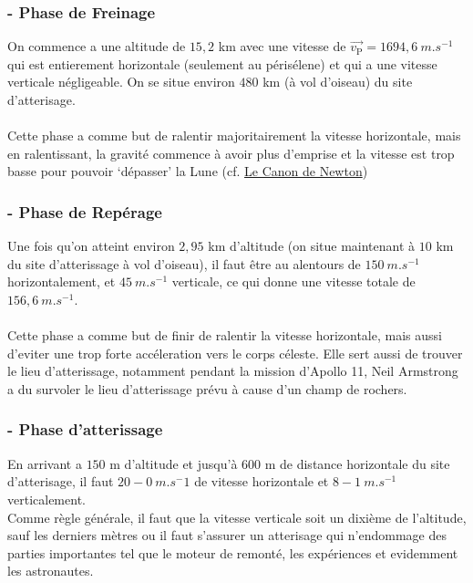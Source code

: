 \documentclass[a4paper, 12pt]{scrartcl}
\begin{document}
\subsubsection{- Phase de Freinage}
On commence a une altitude de $15,2$ km avec une vitesse de $\overrightarrow{v_{\text{P}}} = 1694,6\ \si{m.s^{-1}}$ qui est entierement horizontale (seulement au périsélene) et qui a une vitesse 
verticale négligeable. On se situe environ $480$ km (à vol d'oiseau) du site d'atterisage.
\\ \\ \indent
Cette phase a comme but de ralentir majoritairement la vitesse horizontale, 
mais en ralentissant, la gravité commence à avoir plus d'emprise 
et la vitesse est trop basse pour pouvoir `dépasser' la Lune (cf. \href{https://fr.wikipedia.org/wiki/Canon_de_Newton}{Le Canon de Newton})

\subsubsection{- Phase de Repérage}
Une fois qu'on atteint environ $2,95$ km d'altitude (on situe maintenant à $10$ km du site d'atterissage à vol d'oiseau), il faut être au alentours de $150\ \si{m.s^{-1}}$
horizontalement, et $45\ \si{m.s^{-1}}$ verticale, ce qui donne une vitesse totale de $156,6\ \si{m.s^{-1}}$.
\\ \\ \indent
Cette phase a comme but de finir de ralentir la vitesse horizontale, mais aussi d'eviter une trop
forte accéleration vers le corps céleste. Elle sert aussi de trouver le lieu d'atterissage, notamment pendant
la mission d'Apollo 11, Neil Armstrong a du survoler le lieu d'atterissage prévu à cause d'un
champ de rochers.

\subsubsection{- Phase d'atterissage}
En arrivant a $150$ m d'altitude et  jusqu'à $600$ m de distance horizontale du  
site d'atterisage, il faut $20-0\ \si{m.s^-1}$ de vitesse horizontale et $8-1\ \si{m.s^{-1}}$ verticalement.
\\
Comme règle générale, il faut que la vitesse verticale soit un dixième de l'altitude, sauf les derniers mètres ou il faut
s'assurer un atterisage qui n'endommage des parties importantes tel que le moteur de remonté, les expériences et evidemment les
astronautes. 
\end{document}
